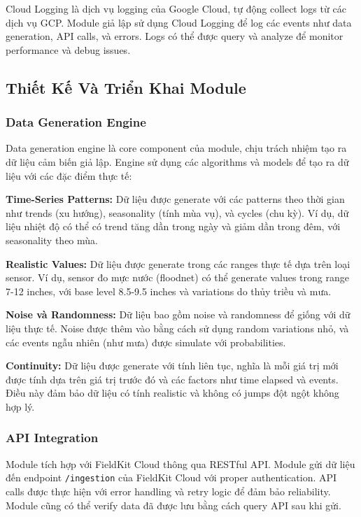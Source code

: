 Cloud Logging là dịch vụ logging của Google Cloud, tự động collect logs từ các dịch vụ GCP. Module giả lập sử dụng Cloud Logging để log các events như data generation, API calls, và errors. Logs có thể được query và analyze để monitor performance và debug issues.

\subsection{Thiết Kế Và Triển Khai Module}

\subsubsection{Data Generation Engine}

Data generation engine là core component của module, chịu trách nhiệm tạo ra dữ liệu cảm biến giả lập. Engine sử dụng các algorithms và models để tạo ra dữ liệu với các đặc điểm thực tế:

\textbf{Time-Series Patterns:} Dữ liệu được generate với các patterns theo thời gian như trends (xu hướng), seasonality (tính mùa vụ), và cycles (chu kỳ). Ví dụ, dữ liệu nhiệt độ có thể có trend tăng dần trong ngày và giảm dần trong đêm, với seasonality theo mùa.

\textbf{Realistic Values:} Dữ liệu được generate trong các ranges thực tế dựa trên loại sensor. Ví dụ, sensor đo mực nước (floodnet) có thể generate values trong range 7-12 inches, với base level 8.5-9.5 inches và variations do thủy triều và mưa.

\textbf{Noise và Randomness:} Dữ liệu bao gồm noise và randomness để giống với dữ liệu thực tế. Noise được thêm vào bằng cách sử dụng random variations nhỏ, và các events ngẫu nhiên (như mưa) được simulate với probabilities.

\textbf{Continuity:} Dữ liệu được generate với tính liên tục, nghĩa là mỗi giá trị mới được tính dựa trên giá trị trước đó và các factors như time elapsed và events. Điều này đảm bảo dữ liệu có tính realistic và không có jumps đột ngột không hợp lý.

\subsubsection{API Integration}

Module tích hợp với FieldKit Cloud thông qua RESTful API. Module gửi dữ liệu đến endpoint \texttt{/ingestion} của FieldKit Cloud với proper authentication. API calls được thực hiện với error handling và retry logic để đảm bảo reliability. Module cũng có thể verify data đã được lưu bằng cách query API sau khi gửi.

